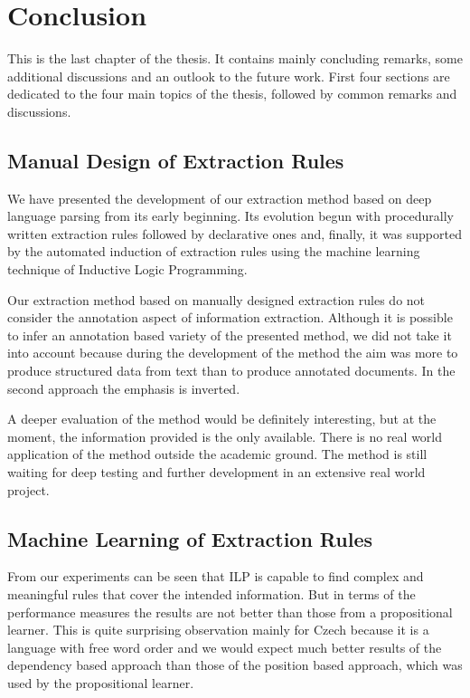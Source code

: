 \chapter{Conclusion} \label{sec:ch_conclusion}

This is the last chapter of the thesis. It contains mainly concluding remarks, some additional discussions and an outlook to the future work. First four sections are dedicated to the four main topics of the thesis, followed by common remarks and discussions. 



\section{Manual Design of Extraction Rules}
We have presented the development of our extraction method based on deep language parsing from its early beginning. Its evolution begun with procedurally written extraction rules followed by declarative ones and, finally, it was supported by the automated induction of extraction rules using the machine learning technique of Inductive Logic Programming.


Our extraction method based on manually designed extraction rules do not consider the annotation aspect of information extraction. Although it is possible to infer an annotation based variety of the presented method, we did not take it into account because during the development of the method the aim was more to produce structured data from text than to produce annotated documents. In the second approach the emphasis is inverted. 

A deeper evaluation of the method would be definitely interesting, but at the moment, the information provided is the only available. There is no real world application of the method outside the academic ground. The method is still waiting for deep testing and further development in an extensive real world project.



\section{Machine Learning of Extraction Rules}

From our experiments can be seen that ILP is capable to find complex and meaningful rules that cover the intended information. But in terms of the performance measures the results are not better than those from a propositional learner. This is quite surprising observation mainly for  Czech because it is a language with free word order and we would expect much better results of the dependency based approach than those of the position based approach, which was used by the propositional learner.

